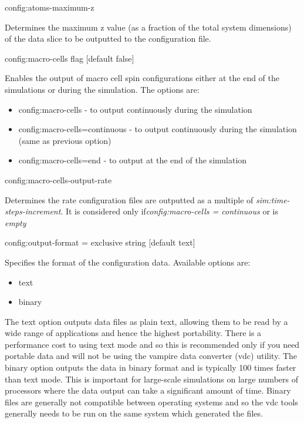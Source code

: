 {\zicf config:atoms-maximum-z} Determines the maximum z value (as a fraction of the total system dimensions) of the data slice to be outputted to the configuration file.

{\zicf config:macro-cells flag [default false]} Enables the output of macro cell spin configurations either at the end of the simulations or during the simulation. The options are:

\begin{itemize}
  \item[] config:macro-cells - to output continuously during the simulation
  \item[] config:macro-cells=continuous - to output continuously during the simulation (same as previous option)
  \item[] config:macro-cells=end - to output at the end of the simulation
\end{itemize}

{\zicf config:macro-cells-output-rate} Determines the rate configuration files are outputted as a multiple of \textit{sim:time-steps-increment}. It is considered only if\newline \textit{config:macro-cells = continuous} or is \textit{empty}

{\zicf config:output-format = exclusive string [default text]}
Specifies the format of the configuration data. Available options are:

\begin{itemize}
  \item[] text
  \item[] binary
\end{itemize}

The text option outputs data files as plain text, allowing them to be read by a wide range of applications and hence the highest portability. There is a performance cost to using text mode and so this is recommended only if you need portable data and will not be using the vampire data converter (vdc) utility. The binary option outputs the data in binary format and is typically 100 times faster than text mode. This is important for large-scale simulations on large numbers of processors where the data output can take a significant amount of time. Binary files are generally not compatible between operating systems and so the vdc tools generally needs to be run on the same system which generated the
files.

